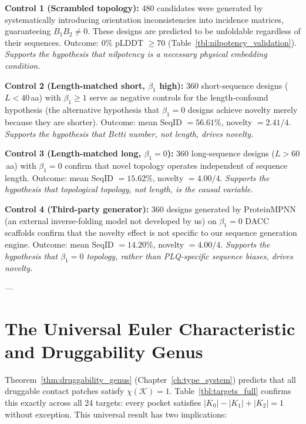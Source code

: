 \textbf{Control 1 (Scrambled topology):}
480 candidates were generated by systematically introducing orientation
inconsistencies into incidence matrices, guaranteeing $B_1 B_2 \ne 0$.
These designs are predicted to be unfoldable regardless of their sequences.
Outcome: 0\% pLDDT $\ge 70$ (Table~\ref{tbl:nilpotency_validation}).
\textit{Supports the hypothesis that nilpotency is a necessary physical
embedding condition.}

\textbf{Control 2 (Length-matched short, $\beta_1$ high):}
360 short-sequence designs ($L < 40$\,aa) with $\beta_1 \ge 1$ serve as
negative controls for the length-confound hypothesis (the alternative
hypothesis that $\beta_1 = 0$ designs achieve novelty merely because
they are shorter).  Outcome: mean SeqID $= 56.61\%$, novelty $= 2.41/4$.
\textit{Supports the hypothesis that Betti number, not length, drives novelty.}

\textbf{Control 3 (Length-matched long, $\beta_1 = 0$):}
360 long-sequence designs ($L > 60$\,aa) with $\beta_1 = 0$ confirm that
novel topology operates independent of sequence length.  Outcome: mean
SeqID $= 15.62\%$, novelty $= 4.00/4$.  \textit{Supports the hypothesis
that topological topology, not length, is the causal variable.}

\textbf{Control 4 (Third-party generator):}
360 designs generated by ProteinMPNN (an external inverse-folding model
not developed by us) on $\beta_1 = 0$ DACC scaffolds confirm that the
novelty effect is not specific to our sequence generation engine.  Outcome:
mean SeqID $= 14.20\%$, novelty $= 4.00/4$.  \textit{Supports the hypothesis
that $\beta_1 = 0$ topology, rather than PLQ-specific sequence biases,
drives novelty.}

---

\section{The Universal Euler Characteristic and Druggability Genus}
\label{sec:euler_validation}

Theorem~\ref{thm:druggability_genus} (Chapter~\ref{ch:type_system}) predicts
that all druggable contact patches satisfy $\chi(\mathcal{K}) = 1$.
Table~\ref{tbl:targets_full} confirms this exactly across all 24 targets:
every pocket satisfies $|K_0| - |K_1| + |K_2| = 1$ without exception.
This universal result has two implications:

